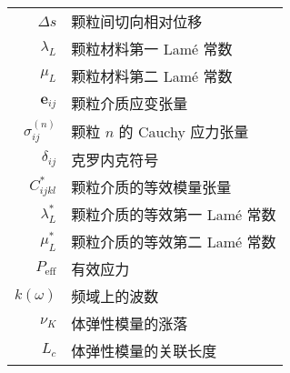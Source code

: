\begin{nomenclature*}
\begin{longtable}{rl}
  $\Delta s$ & 颗粒间切向相对位移 \\
  $\lambda_{L}$ & 颗粒材料第一 Lamé 常数\\
  $\mu_{L}$ & 颗粒材料第二 Lamé 常数\\
  $\mathbf{e}_{ij}$ & 颗粒介质应变张量\\
  $\sigma_{ij}^{(n)}$ & 颗粒 $n$ 的 Cauchy 应力张量\\
  $\delta_{ij}$ & 克罗内克符号\\
  $C_{ijkl}^{*}$ & 颗粒介质的等效模量张量\\
  $\lambda_{L}^{*}$ &颗粒介质的等效第一 Lamé 常数\\
  $\mu_{L}^{*}$ & 颗粒介质的等效第二 Lamé 常数\\
  $P_{\text{eff}}$ & 有效应力\\
  $k(\omega)$ & 频域上的波数\\
  $\nu_{K}$ & 体弹性模量的涨落\\
  $L_{c}$ & 体弹性模量的关联长度\\


\end{longtable}
\end{nomenclature*}
